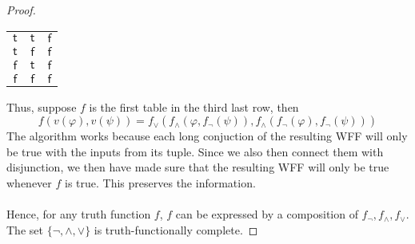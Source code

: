 \documentclass[12pt]{article}
\begin{document}
\begin{proof}
\begin{center}
\begin{tabular}{cc|c}
            $\mathsf{t}$ & $\mathsf{t}$ & $\mathsf{f}$ \\
            $\mathsf{t}$ & $\mathsf{f}$ & $\mathsf{f}$ \\
            $\mathsf{f}$ & $\mathsf{t}$ & $\mathsf{f}$ \\
            $\mathsf{f}$ & $\mathsf{f}$ & $\mathsf{f}$ \\
        \end{tabular}
    \end{center}
$$$$
Thus, suppose $f$ is the first table in the third last row, then 
$$f(v(\varphi),v(\psi)) = f_{\lor}(f_{\land}(\varphi,f_{\neg}(\psi)),f_{\land}(f_{\neg}(\varphi),f_{\neg}(\psi)))$$
The algorithm works because each long conjuction of the resulting WFF will only be true with the inputs from its tuple.
Since we also then connect them with disjunction, we then have made sure that the resulting WFF will only be true whenever $f$ is true.
This preserves the information.\\
\\
Hence, for any truth function $f$, $f$ can be expressed by a composition of $f_{\neg}, f_{\land}, f_{\lor}$.
The set $\{\neg, \land, \lor\}$ is truth-functionally complete.

\end{proof}
\end{document}
